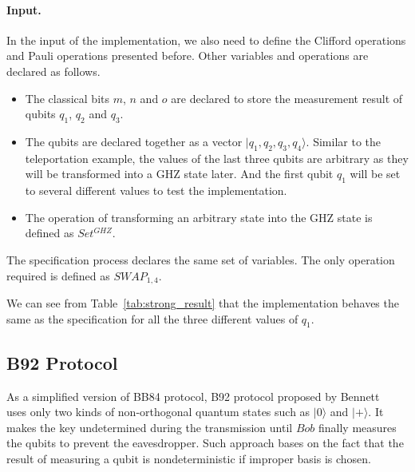 \documentclass[a4paper,runningheads]{llncs}
\begin{document}
\paragraph{Input.}
In the input of the implementation, we also need to define the Clifford operations and Pauli operations presented before. Other variables and operations are declared as follows.
\begin{itemize}
    \item The classical bits $m$, $n$ and $o$ are declared to store the measurement result of qubits $q_1$, $q_2$ and $q_3$.
    \item The qubits are declared together as a vector $|q_1,q_2,q_3,q_4\rangle$. Similar to the teleportation example, the values of the last three qubits are arbitrary as they will be transformed into a GHZ state later. And the first qubit $q_1$ will be set to several different values to test the implementation.
    \item The operation of transforming an arbitrary state into the GHZ state is defined as $Set^{GHZ}$.
\end{itemize}
The specification process declares the same set of variables. The only operation required is defined as $SWAP_{1,4}$.

We can see from Table~\ref{tab:strong_result} that the implementation behaves the same as the specification for all the three different values of $q_1$.

\subsection{B92 Protocol}
As a simplified version of BB84 protocol, B92 protocol proposed by Bennett~\cite{B92} uses only two kinds of non-orthogonal quantum states such as $|0\rangle$ and $|+\rangle$. It makes the key undetermined during the transmission until $Bob$ finally measures the qubits to prevent the eavesdropper. Such approach bases on the fact that the result of measuring a qubit is nondeterministic if improper basis is chosen.
\end{document}
